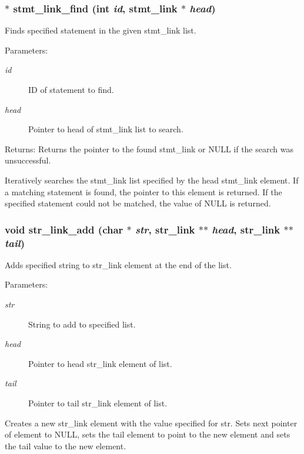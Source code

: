 \subsubsection{$\ast$ stmt\_\-link\_\-find (int {\em id}, {\bf stmt\_\-link} $\ast$ {\em head})}\label{link_8c_a12}


Finds specified statement in the given stmt\_\-link list. 

\begin{Desc}
\item[Parameters:]
\begin{description}
\item[{\em id}]ID of statement to find. \item[{\em head}]Pointer to head of stmt\_\-link list to search.\end{description}
\end{Desc}
\begin{Desc}
\item[Returns:]Returns the pointer to the found stmt\_\-link or NULL if the search was unsuccessful.\end{Desc}
Iteratively searches the stmt\_\-link list specified by the head stmt\_\-link element. If a matching statement is found, the pointer to this element is returned. If the specified statement could not be matched, the value of NULL is returned. 
\subsubsection{\setlength{\rightskip}{0pt plus 5cm}void str\_\-link\_\-add (char $\ast$ {\em str}, {\bf str\_\-link} $\ast$$\ast$ {\em head}, {\bf str\_\-link} $\ast$$\ast$ {\em tail})}\label{link_8c_a0}


Adds specified string to str\_\-link element at the end of the list. 

\begin{Desc}
\item[Parameters:]
\begin{description}
\item[{\em str}]String to add to specified list. \item[{\em head}]Pointer to head str\_\-link element of list. \item[{\em tail}]Pointer to tail str\_\-link element of list.\end{description}
\end{Desc}
Creates a new str\_\-link element with the value specified for str. Sets next pointer of element to NULL, sets the tail element to point to the new element and sets the tail value to the new element. 
